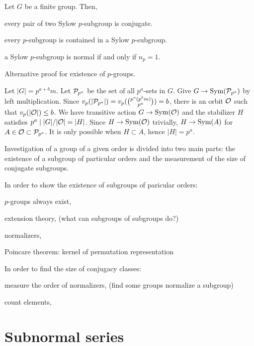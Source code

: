 \documentclass{../note}
\begin{document}
\begin{cor}
Let $G$ be a finite group.
Then,
\begin{parts}
\item every pair of two Sylow $p$-subgroup is conjugate.
\item every $p$-subgroup is contained in a Sylow $p$-subgroup.
\item a Sylow $p$-subgroup is normal if and only if $n_p=1$.
\end{parts}
\end{cor}

\begin{thm}
Alternative proof for existence of $p$-groups.
\end{thm}
\begin{pf}
Let $|G|=p^{a+b}m$.
Let $\mathcal{P}_{p^a}$ be the set of all $p^a$-sets in $G$.
Give $G\to\operatorname{Sym}(\mathcal{P}_{p^a})$ by left multiplication.
Since $v_p(|\mathcal{P}_{p^a}|)=v_p(\binom{p^a(p^bm)}{p^a})=b$, there is an orbit $\mathcal{O}$ such that $v_p(|\mathcal{O}|)\le b$.
We have transitive action $G\to\operatorname{Sym}(\mathcal{O})$ and the stabilizer $H$ satisfies $p^a\mid|G|/|\mathcal{O}|=|H|$.
Since $H\to\operatorname{Sym}(\mathcal{O})$ trivially, $H\to\operatorname{Sym}(A)$ for $A\in\mathcal{O}\subset\mathcal{P}_{p^a}$.
It is only possible when $H\subset A$, hence $|H|=p^a$.
\end{pf}

Investigation of a group of a given order is divided into two main parts: the existence of a subgroup of particular orders and the measurement of the size of conjugate subgroups.

In order to show the existence of subgroups of paricular orders:
\begin{parts}
\item $p$-groups always exist,
\item extension theory, (what can subgroups of subgroups do?)
\item normalizers,
\item Poincare theorem: kernel of permutation representation
\end{parts}

In order to find the size of conjugacy classes:
\begin{parts}
\item measure the order of normalizers, (find some groups normalize a subgroup)
\item count elements,
\end{parts}


\chapter{Subnormal series}
\end{document}
